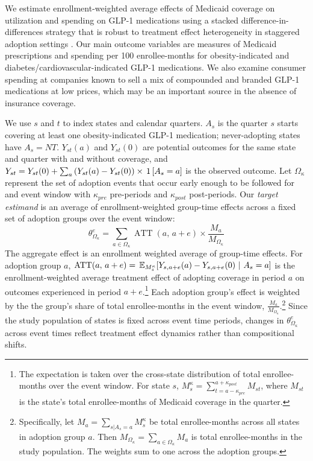 We estimate enrollment-weighted average effects of Medicaid coverage on utilization and spending on GLP-1 medications using a stacked difference-in-differences strategy that is robust to treatment effect heterogeneity in staggered adoption settings \citep{wing2024stacked, goodman2021difference, dechaisemartin2020two}. Our main outcome variables are measures of Medicaid prescriptions and spending per 100 enrollee-months for obesity-indicated and diabetes/cardiovascular-indicated GLP-1 medications. We also examine consumer spending at companies known to sell a mix of compounded and branded GLP-1 medications at low prices, which may be an important source in the absence of insurance coverage.

We use $s$ and $t$ to index states and calendar quarters. $A_s$ is the quarter $s$ starts covering at least one obesity-indicated GLP-1 medication; never-adopting states have $A_s = NT$. $Y_{st}(a)$ and $Y_{st}(0)$ are potential outcomes for the same state and quarter with and without coverage, and $Y_{st} = Y_{st}(0) +\sum_a \bp{Y_{st}(a)-Y_{st}(0)} \times \one{A_s = a}$ is the observed outcome. Let $\Omega_{\kappa}$ represent the set of adoption events that occur early enough to be followed for and event window with $\kappa_{pre}$ pre-periods and $\kappa_{post}$ post-periods. Our \emph{target estimand} is an average of enrollment-weighted group-time effects across a fixed set of adoption groups over the event window:
%
\begin{equation*}
  \theta_{\Omega_{\kappa}}^{e} = \sum_{a \in \Omega_{\kappa}} \operatorname{ATT}(a,\, a+e) \times \frac{M_a}{M_{\Omega_{\kappa}}}
\end{equation*}
%
The aggregate effect is an enrollment weighted average of group-time effects. For adoption group $a$, $\operatorname{ATT}(a,\, a+e) = \E[M_s^{\kappa}]{Y_{s,a+e}(a) - Y_{s,a+e}(0)}{A_s = a}$ is the enrollment-weighted average treatment effect of adopting coverage in period $a$ on outcomes experienced in period $a+e$.\footnote{The expectation is taken over the cross-state distribution of total enrollee-months over the event window. For state $s$,  $M_s^{\kappa} = \sum_{t=a-\kappa_{pre}}^{a+\kappa_{post}} M_{st}$, where $M_{st}$ is the state's total enrollee-months of Medicaid coverage in the quarter.} Each adoption group's effect is weighted by the the group's share of total enrollee-months in the event window, $\frac{M_a}{M_{\Omega_{\kappa}}}$.\footnote{Specifically, let $M_a = \sum_{s|A_s=a} M_s^{\kappa}$ be total enrollee-months across all states in adoption group $a$. Then $M_{\Omega_{\kappa}} = \sum_{a\in\Omega_{\kappa}} M_a$ is total enrollee-months in the study population. The weights sum to one across the adoption groups.} Since the study population of states is fixed across event time periods, changes in $\theta_{\Omega_{\kappa}}^{e}$ across event times reflect treatment effect dynamics rather than compositional shifts. 

